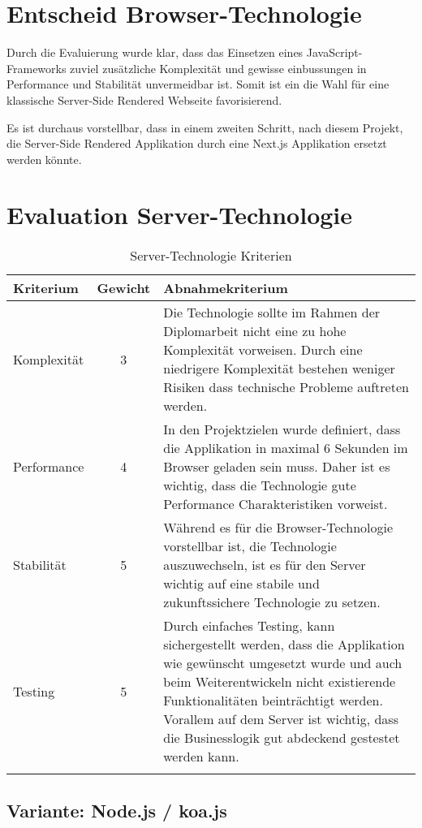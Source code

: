 \section{Entscheid Browser-Technologie}\label{entscheid-browser-technologie}

Durch die Evaluierung wurde klar, dass das Einsetzen eines JavaScript-Frameworks
zuviel zusätzliche Komplexität und gewisse einbussungen in Performance und Stabilität
unvermeidbar ist. Somit ist ein die Wahl für eine klassische Server-Side Rendered
Webseite favorisierend.

Es ist durchaus vorstellbar, dass in einem zweiten Schritt, nach diesem Projekt,
die Server-Side Rendered Applikation durch eine Next.js Applikation ersetzt werden
könnte.

\clearpage
\section{Evaluation Server-Technologie}\label{evaluation-server-technologie}

\begin{longtable}[]{@{}p{2cm}cp{10cm}@{}}
  \toprule
  \textbf{Kriterium} & \textbf{Gewicht} & \textbf{Abnahmekriterium}\tabularnewline
  \midrule
  \endhead
  Komplexität        & 3                & Die Technologie sollte im Rahmen der Diplomarbeit nicht eine zu hohe Komplexität vorweisen. Durch eine niedrigere Komplexität bestehen weniger Risiken dass technische Probleme auftreten werden.\tabularnewline
  \midrule
  Performance        & 4                & In den Projektzielen wurde definiert, dass die Applikation in maximal 6 Sekunden im Browser geladen sein muss. Daher ist es wichtig, dass die Technologie gute Performance Charakteristiken vorweist.\tabularnewline
  \midrule
  Stabilität         & 5                & Während es für die Browser-Technologie vorstellbar ist, die Technologie auszuwechseln, ist es für den Server wichtig auf eine stabile und zukunftssichere Technologie zu setzen.\tabularnewline
  \midrule
  Testing            & 5                & Durch einfaches Testing, kann sichergestellt werden, dass die Applikation wie gewünscht umgesetzt wurde und auch beim Weiterentwickeln nicht existierende Funktionalitäten beinträchtigt werden. Vorallem auf dem Server ist wichtig, dass die Businesslogik gut abdeckend gestestet werden kann.\tabularnewline
  \bottomrule
  \caption{Server-Technologie Kriterien}
\end{longtable}

\subsection{Variante: Node.js / koa.js}


